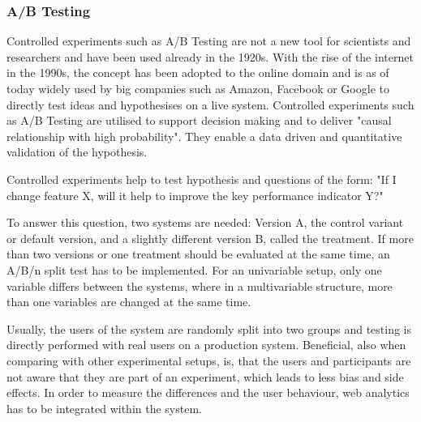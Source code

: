 \subsubsection{A/B Testing}



Controlled experiments such as A/B Testing are not a new tool for scientists and researchers and have been used already in the 1920s. %
With the rise of the internet in the 1990s, the concept has been adopted to the online domain and is as of today widely used by big companies such as Amazon, Facebook or Google to directly test ideas and hypothesises on a live system.
Controlled experiments such as A/B Testing are utilised to support decision making and to deliver "causal relationship with high probability". %
They enable a data driven and quantitative validation of the hypothesis. %

Controlled experiments help to test hypothesis and questions of the form: "If I change feature X, will it help to improve the key performance indicator Y?"

To answer this question,  two systems are needed: Version A, the control variant or default version, and a slightly different version B, called the treatment.
If more than two versions or one treatment should be evaluated at the same time,  an A/B/n split test has to be implemented.
For an univariable setup, only one variable differs between the systems, where in a multivariable structure, more than one variables are changed at the same time.

Usually, the users of the system are randomly split into two groups and testing is directly performed with real users on a production system.
Beneficial, also when comparing with other experimental setups, is, that the users and participants are not aware that they are part of an experiment, which leads to less bias and side effects.
In order to measure the differences and the user behaviour, web analytics has to be integrated within the system.




